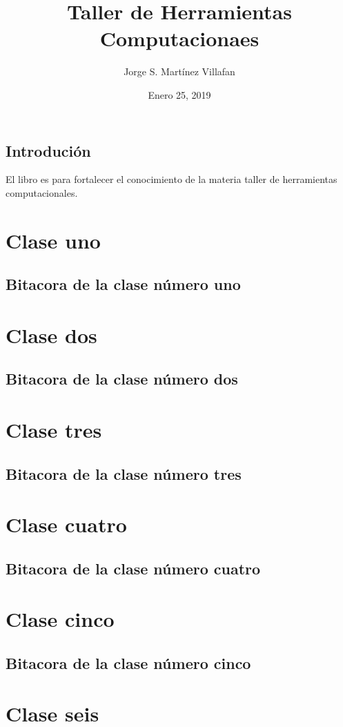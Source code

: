 \documentclass{book}
\title{ Taller de Herramientas Computacionaes}
\author{Jorge S. Martínez Villafan}
\date{Enero 25, 2019}
\begin{document}
\maketitle
\tableofcontents
\section*{Introdución} El libro es para fortalecer el conocimiento de la materia taller de herramientas computacionales.


\chapter{Clase uno}
\section{Bitacora de la clase número uno}
\chapter{Clase dos}
\section{Bitacora de la clase número dos}
\chapter{Clase tres}
\section{Bitacora de la clase número tres}
\chapter{Clase cuatro}
\section{Bitacora de la clase número cuatro}
\chapter{Clase cinco}
\section{Bitacora de la clase número cinco}
\chapter{Clase seis}
\end{document}

